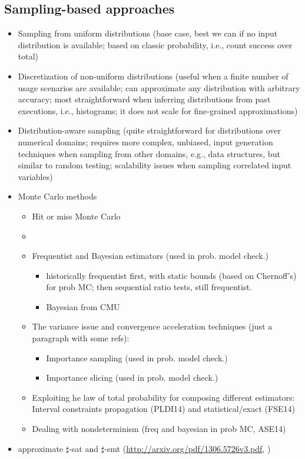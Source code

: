 \subsection{Sampling-based approaches}
	\begin{itemize}
		\item Sampling from uniform distributions (base case, best we can if no input distribution is available; based on classic probability, i.e., count success over total)
		\item Discretization of non-uniform distributions (useful when a finite number of usage scenarios are available; can approximate any distribution with arbitrary accuracy; most straightforward when inferring distributions from past executions, i.e., histograms; it does not scale for fine-grained approximations)
		\item Distribution-aware sampling (quite straightforward for distributions over numerical domains; requires more complex, unbiased, input generation techniques when sampling from other domains, e.g., data structures, but similar to random testing; scalability issues when sampling correlated input variables)
      
		\item Monte Carlo methods
			\begin{itemize}
				\item Hit or miss Monte Carlo
				\item {}
				\item Frequentist and Bayesian estimators (used in prob. model check.)
					\begin{itemize}
						\item historically frequentist first, with static bounds (based on Chernoff's) for prob MC; then sequential ratio tests, still frequentist.
						\item Bayesian from CMU
					\end{itemize}
				\item The variance issue and convergence acceleration techniques (just a paragraph with some refs):
					\begin{itemize}
						\item Importance sampling (used in prob. model check.)
						\item Importance slicing (used in prob. model check.)
					\end{itemize}

				\item Exploiting he law of total probability for composing different estimators: Interval constraints propagation (PLDI14) and statistical/exact (FSE14)
				\item Dealing with nondeterminism (freq and bayesian in prob MC, ASE14)	
			\end{itemize}
			
			\item approximate $\sharp$-sat and $\sharp$-smt (\url{http://arxiv.org/pdf/1306.5726v3.pdf}, )


		 
	\end{itemize}
